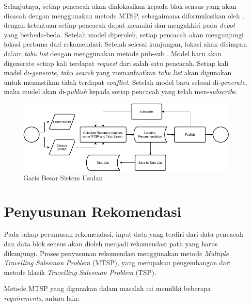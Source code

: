Selanjutnya, setiap pencacah akan dialokasikan kepada blok sensus yang akan dicacah dengan menggunakan metode MTSP, sebagaimana diformulasikan oleh \citep{bektas_multiple_2006}, dengan ketentuan setiap pencacah dapat memulai dan mengakhiri pada \textit{depot} yang berbeda-beda. Setelah model diperoleh, setiap pencacah akan mengunjungi lokasi pertama dari rekomendasi. Setelah selesai kunjungan, lokasi akan disimpan dalam \textit{tabu list} dengan menggunakan metode pub-sub \citep{chen_efficient_2003}. Model baru akan digenerate setiap kali terdapat \textit{request} dari salah satu pencacah. Setiap kali model di-\textit{generate}, \textit{tabu search} \citep{glover_tabu_1989, glover_tabu_1990} yang memanfaatkan \textit{tabu list} akan digunakan untuk memastikan tidak terdapat \textit{conflict}. Setelah model baru selesai di-\textit{generate}, maka mudel akan di-\textit{publish} kepada setiap pencacah yang telah men-\textit{subscribe}.


\begin{figure}[h]
    \centering
    \includegraphics[width=\textwidth]{../../Resources/Images/design_overview}
    \caption{Garis Besar Sistem Usulan}
    \label{fig:design_overview}
\end{figure}


\section{Penyusunan Rekomendasi}

Pada tahap perumusan rekomendasi, input data yang terdiri dari data pencacah dan data blok sensus akan dioleh menjadi rekomendasi path yang harus dikunjungi. Proses penyusunan rekomendasi menggunakan metode \textit{Multiple Travelling Salesman Problem} (MTSP), yang merupakan pengembangan dari metode klasik \textit{Travelling Salesman Problem} (TSP).


Metode MTSP yang digunakan dalam masalah ini memiliki beberapa \textit{requirements}, antara lain:

